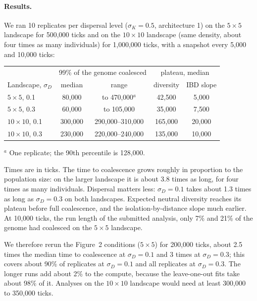 \paragraph{Results.} We ran 10 replicates per dispersal level
($\sigma_K=0.5$, architecture 1) on the $5\times5$ landscape for 500,000
ticks and on the $10\times10$ landscape (same density, about four times as
many individuals) for 1,000,000 ticks, with a snapshot every 5,000 and
10,000 ticks:

\begin{center}
\begin{tabular}{lcccc}
\toprule
 & \multicolumn{2}{c}{99\% of the genome coalesced} & \multicolumn{2}{c}{plateau, median} \\
Landscape, $\sigma_D$ & median & range & diversity & IBD slope \\
\midrule
$5\times5$, 0.1 & 80,000 & to 470,000$^{a}$ & 42,500 & 5,000 \\
$5\times5$, 0.3 & 60,000 & to 105,000 & 35,000 & 7,500 \\
$10\times10$, 0.1 & 300,000 & 290,000--310,000 & 165,000 & 20,000 \\
$10\times10$, 0.3 & 230,000 & 220,000--240,000 & 135,000 & 10,000 \\
\bottomrule
\end{tabular}
\end{center}
{\footnotesize $^{a}$ One replicate; the 90th percentile is 128,000.\par}

\noindent Times are in ticks. The time to coalescence grows roughly in
proportion to the population size: on the larger landscape it is about 3.8
times as long, for four times as many individuals. Dispersal matters less:
$\sigma_D=0.1$ takes about 1.3 times as long as $\sigma_D=0.3$ on both
landscapes. Expected neutral diversity reaches its plateau before full
coalescence, and the isolation-by-distance slope much earlier. At 10,000
ticks, the run length of the submitted analysis, only 7\% and 21\% of the
genome had coalesced on the $5\times5$ landscape.

We therefore rerun the Figure~2 conditions ($5\times5$) for 200,000
ticks, about 2.5 times the median time to coalescence at $\sigma_D=0.1$ and
3 times at $\sigma_D=0.3$; this covers about 90\% of replicates at
$\sigma_D=0.1$ and all replicates at $\sigma_D=0.3$. The longer runs add
about 2\% to the compute, because the leave-one-out fits take about 98\%
of it. Analyses on the $10\times10$ landscape would need at least 300,000
to 350,000 ticks.


